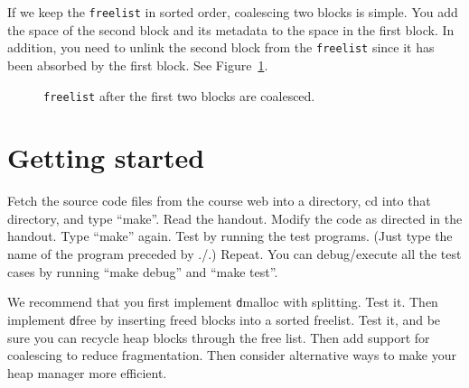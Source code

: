 \documentclass[a4paper,10pt]{article}
\newcommand{\comment}[1]{}
\begin{document}
If we keep the \texttt{freelist} in sorted order, coalescing two blocks is
simple. You add the
space of the second block and its metadata to the space in the first block. In
addition, you need to unlink the second block from
the \texttt{freelist} since it has been absorbed by the first block.
See Figure~\ref{fig:coalesce}.

\begin{figure}[!ht]
\centering
{}\hspace{2mm}\hspace{1mm}
\caption{\texttt{freelist} after the first two blocks are coalesced.}
\label{fig:coalesce}
\end{figure}

\comment{
\section{Finding the right fit for the requested bytes}
Finding the right fit is hard since it requires you to predict the pattern of
\emph{future} requests. For example, suppose after $n$ requests all the blocks 
are exactly four words in size. Does this heap suffer from fragmentation? The
answer depends on future requests. Check the reference~\cite{Bryant} for more material
on this topic.

While, there is lot of research done in finding the right fit algorithms, 
we recommend to start with the simplest choice: the first fit algorithm, which
essentially traverses the \texttt{freelist} from the head until it finds the
spot. Once you are done with first fit and you have a working code, it is
easier to implement best fit or next fit algorithms.

}

\section{Getting started}

Fetch the source code files from the course web into a directory, cd into that directory, 
and type ``make''. Read the handout. Modify the code as directed in the handout. Type
``make'' again. Test by running the test programs. (Just type the name of the program preceded by ./.) 
Repeat. You can debug/execute all the test cases by running ``make
debug'' and ``make test''. 

We recommend that you first implement {\texttt dmalloc} with
splitting.   Test it.  Then implement {\texttt dfree} by inserting
freed blocks into a sorted freelist.   Test it, and be sure you can
recycle heap blocks through the free list.  Then add support for coalescing to
reduce fragmentation.  Then consider alternative ways to make your
heap manager more efficient.
\end{document}
